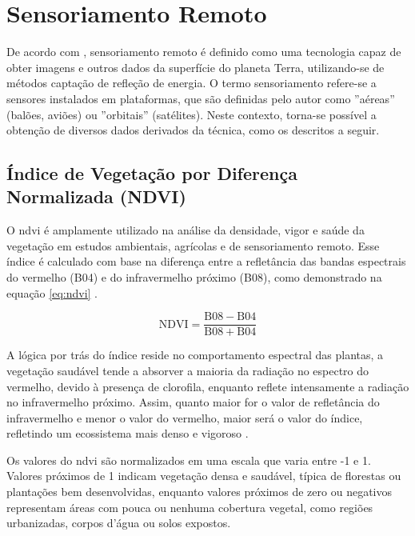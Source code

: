 \section{Sensoriamento Remoto}
De acordo com , sensoriamento remoto é definido como uma tecnologia capaz de obter imagens e outros dados da superfície do planeta Terra, utilizando-se de métodos captação de refleção de energia. O termo sensoriamento refere-se a sensores instalados em plataformas, que são definidas pelo autor como ''aéreas'' (balões, aviões) ou ''orbitais'' (satélites). Neste contexto, torna-se possível a obtenção de diversos dados derivados da técnica, como os descritos a seguir. 

\subsection{Índice de Vegetação por Diferença Normalizada (NDVI)}
O \gls{ndvi} é amplamente utilizado na análise da densidade, vigor e saúde da vegetação em estudos ambientais, agrícolas e de sensoriamento remoto. Esse índice é calculado com base na diferença entre a refletância das bandas espectrais do vermelho (B04) e do infravermelho próximo (B08), como demonstrado na equação \ref{eq:ndvi} \cite{sasso2022sdm}.

\begin{equation}
\mathrm{NDVI} = \frac{\mathrm{B08} - \mathrm{B04}}{\mathrm{B08} + \mathrm{B04}}
\label{eq:ndvi}
\end{equation}

A lógica por trás do índice reside no comportamento espectral das plantas, a vegetação saudável tende a absorver a maioria da radiação no espectro do vermelho, devido à presença de clorofila, enquanto reflete intensamente a radiação no infravermelho próximo. Assim, quanto maior for o valor de refletância do infravermelho e menor o valor do  vermelho, maior será o valor do índice, refletindo um ecossistema mais denso e vigoroso \cite{marques2018ndvi_ndwis}.

Os valores do \gls{ndvi} são normalizados em uma escala que varia entre -1 e 1. Valores próximos de 1 indicam vegetação densa e saudável, típica de florestas ou plantações bem desenvolvidas, enquanto valores próximos de zero ou negativos representam áreas com pouca ou nenhuma cobertura vegetal, como regiões urbanizadas, corpos d’água ou solos expostos.

